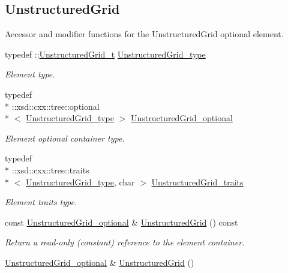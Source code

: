 \subsection*{Unstructured\-Grid}
\label{_amgrp51267337395fceec37fec7e87b9a53e5}%
Accessor and modifier functions for the Unstructured\-Grid optional element. \begin{DoxyCompactItemize}
\item 
typedef \-::\hyperlink{classUnstructuredGrid__t}{Unstructured\-Grid\-\_\-t} \hyperlink{classVTKFile__t_a34ea02f6804e701657f11a8dc3851951}{Unstructured\-Grid\-\_\-type}
\begin{DoxyCompactList}\small\item\em Element type. \end{DoxyCompactList}\item 
typedef \\*
\-::xsd\-::cxx\-::tree\-::optional\\*
$<$ \hyperlink{classVTKFile__t_a34ea02f6804e701657f11a8dc3851951}{Unstructured\-Grid\-\_\-type} $>$ \hyperlink{classVTKFile__t_ada5bb5a706e03ef1ab2ed1513ea83833}{Unstructured\-Grid\-\_\-optional}
\begin{DoxyCompactList}\small\item\em Element optional container type. \end{DoxyCompactList}\item 
typedef \\*
\-::xsd\-::cxx\-::tree\-::traits\\*
$<$ \hyperlink{classVTKFile__t_a34ea02f6804e701657f11a8dc3851951}{Unstructured\-Grid\-\_\-type}, char $>$ \hyperlink{classVTKFile__t_a02772a5f713678f02e94188d6a552528}{Unstructured\-Grid\-\_\-traits}
\begin{DoxyCompactList}\small\item\em Element traits type. \end{DoxyCompactList}\item 
const \hyperlink{classVTKFile__t_ada5bb5a706e03ef1ab2ed1513ea83833}{Unstructured\-Grid\-\_\-optional} \& \hyperlink{classVTKFile__t_a118852d8ec1f8039d1fd5c914282351a}{Unstructured\-Grid} () const 
\begin{DoxyCompactList}\small\item\em Return a read-\/only (constant) reference to the element container. \end{DoxyCompactList}\item 
\hyperlink{classVTKFile__t_ada5bb5a706e03ef1ab2ed1513ea83833}{Unstructured\-Grid\-\_\-optional} \& \hyperlink{classVTKFile__t_aa4746d4a723076d4643b8ef16a9c3890}{Unstructured\-Grid} ()

\end{DoxyCompactItemize}
